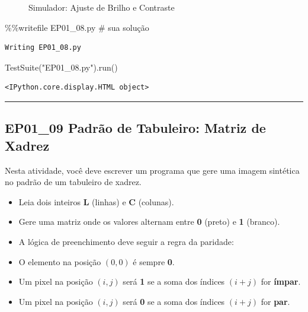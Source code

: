 \documentclass[
  portuguese,
  letterpaper,
  openany,
  oneside,
  12pt,
  a4paper]{book}
\newenvironment{Shaded}{\begin{snugshade}}{\end{snugshade}}
\newcommand{\CommentTok}[1]{\textcolor[rgb]{0.37,0.37,0.37}{#1}}
\newcommand{\NormalTok}[1]{\textcolor[rgb]{0.00,0.23,0.31}{#1}}
\newcommand{\OperatorTok}[1]{\textcolor[rgb]{0.37,0.37,0.37}{#1}}
\newcommand{\StringTok}[1]{\textcolor[rgb]{0.13,0.47,0.30}{#1}}
\providecommand{\tightlist}{%
  \setlength{\itemsep}{0pt}\setlength{\parskip}{0pt}}
\begin{document}
\begin{figure}


\caption{\label{fig-01-brilho-contraste}Simulador: Ajuste de Brilho e
Contraste}

\end{figure}%

\begin{Shaded}
\begin{Highlighting}[]
\OperatorTok{\%\%}\NormalTok{writefile EP01\_08.py}
\CommentTok{\# sua solução}
\end{Highlighting}
\end{Shaded}

\begin{verbatim}
Writing EP01_08.py
\end{verbatim}

\begin{Shaded}
\begin{Highlighting}[]
\NormalTok{TestSuite(}\StringTok{"EP01\_08.py"}\NormalTok{).run()}
\end{Highlighting}
\end{Shaded}

\begin{verbatim}
<IPython.core.display.HTML object>
\end{verbatim}

\begin{center}\rule{0.5\linewidth}{0.5pt}\end{center}

\subsection{\texorpdfstring{EP01\_09  Padrão de
Tabuleiro: Matriz de
Xadrez}{EP01\_09  Padrão de Tabuleiro: Matriz de Xadrez}}\label{ep01_09-padruxe3o-de-tabuleiro-matriz-de-xadrez}

Nesta atividade, você deve escrever um programa que gere uma imagem
sintética no padrão de um tabuleiro de xadrez.

\begin{itemize}
\tightlist
\item
  Leia dois inteiros \textbf{L} (linhas) e \textbf{C} (colunas).
\item
  Gere uma matriz onde os valores alternam entre \textbf{0} (preto) e
  \textbf{1} (branco).
\item
  A lógica de preenchimento deve seguir a regra da paridade:
\item
  O elemento na posição \((0,0)\) é sempre \textbf{0}.
\item
  Um pixel na posição \((i, j)\) será \textbf{1} se a soma dos índices
  \((i + j)\) for \textbf{ímpar}.
\item
  Um pixel na posição \((i, j)\) será \textbf{0} se a soma dos índices
  \((i + j)\) for \textbf{par}.
\end{itemize}
\end{document}
